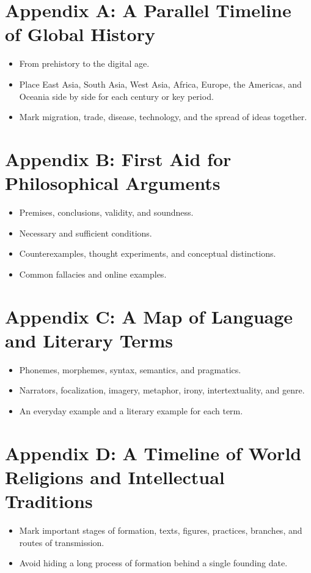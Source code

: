 \section*{Appendix A: A Parallel Timeline of Global History}
\begin{itemize}
\item From prehistory to the digital age.
\item Place East Asia, South Asia, West Asia, Africa, Europe, the Americas, and Oceania side by side for each century or key period.
\item Mark migration, trade, disease, technology, and the spread of ideas together.
\end{itemize}
\section*{Appendix B: First Aid for Philosophical Arguments}
\begin{itemize}
\item Premises, conclusions, validity, and soundness.
\item Necessary and sufficient conditions.
\item Counterexamples, thought experiments, and conceptual distinctions.
\item Common fallacies and online examples.
\end{itemize}
\section*{Appendix C: A Map of Language and Literary Terms}
\begin{itemize}
\item Phonemes, morphemes, syntax, semantics, and pragmatics.
\item Narrators, focalization, imagery, metaphor, irony, intertextuality, and genre.
\item An everyday example and a literary example for each term.
\end{itemize}
\section*{Appendix D: A Timeline of World Religions and Intellectual Traditions}
\begin{itemize}
\item Mark important stages of formation, texts, figures, practices, branches, and routes of transmission.
\item Avoid hiding a long process of formation behind a single founding date.
\end{itemize}
